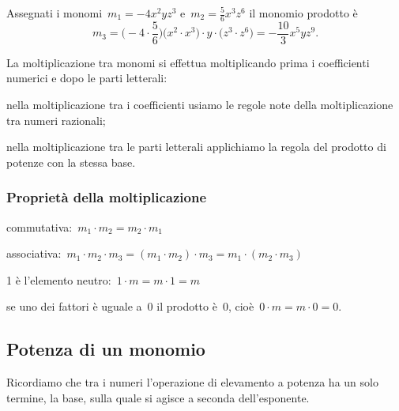 \begin{exrig}
 \begin{esempio}
Assegnati i monomi~$m_{1}=-4x^{2}yz^{3}$ e~$m_{2}=\frac{5}{6}x^{3}z^{6}$
il monomio prodotto è
\[m_{3}=\bigg(-4\cdot {\frac{5}{6}}\bigg)\big(x^{2}\cdot x^{3}\big)\cdot y\cdot \big(z^{3}\cdot z^{6}\big)=-\frac{10}{3}x^{5}yz^{9}.\]
 \end{esempio}
\end{exrig}


\begin{procedura}
La moltiplicazione tra monomi si effettua moltiplicando prima i
coefficienti numerici e dopo le parti letterali:

\begin{enumeratea}
 \item nella moltiplicazione tra i coefficienti usiamo le regole note della
moltiplicazione tra numeri razionali;
 \item nella moltiplicazione tra le parti letterali applichiamo la regola
del prodotto di potenze con la stessa base.
\end{enumeratea}
\end{procedura}

\subsubsection{Proprietà della moltiplicazione}

\begin{enumeratea}
\item commutativa:~$m_{1}\cdot m_{2}=m_{2}\cdot m_{1}$
\item associativa:~$m_{1}\cdot m_{2}\cdot m_{3}=(m_{1}\cdot m_{2})\cdot m_{3}=m_{1}\cdot (m_{2}\cdot m_{3})$
\item 1 è l'elemento neutro:~$1\cdot m=m\cdot 1=m$
\item se uno dei fattori è uguale a~0 il prodotto è~0, cioè~$0\cdot m=m\cdot 0=0$.
\end{enumeratea}


\subsection{Potenza di un monomio}
\label{subsec:09_monomi_potenza}

Ricordiamo che tra i numeri l'operazione di elevamento a
potenza ha un solo termine, la base, sulla quale si agisce a seconda
dell'esponente.

